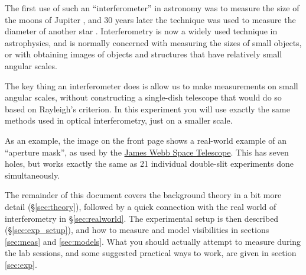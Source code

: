 \documentclass[11pt]{article}
\begin{document}
The first use of such an ``interferometer'' in astronomy was to measure the size of the moons of Jupiter \citep{1891PASP....3..274M,1891Natur..45..160M}, and 30 years later the technique was used to measure the diameter of another star \citep{1921ApJ....53..249M}. Interferometry is now a widely used technique in astrophysics, and is normally concerned with measuring the sizes of small objects, or with obtaining images of objects and structures that have relatively small angular scales.


The key thing an interferometer does is allow us to make measurements on small angular scales, without constructing a single-dish telescope that would do so based on Rayleigh's criterion. In this experiment you will use exactly the same methods used in optical interferometry, just on a smaller scale.

As an example, the image on the front page shows a real-world example of an ``aperture mask'', as used by the \href{https://jwst-docs.stsci.edu/jwst-near-infrared-imager-and-slitless-spectrograph/niriss-observing-modes/niriss-aperture-masking-interferometry}{James Webb Space Telescope}. This has seven holes, but works exactly the same as 21 individual double-slit experiments done simultaneously.

The remainder of this document covers the background theory in a bit more detail (\S \ref{sec:theory}), followed by a quick connection with the real world of interferometry in \S \ref{sec:realworld}. The experimental setup is then described (\S \ref{sec:exp_setup}), and how to measure and model visibilities in sections \ref{sec:meas} and \ref{sec:models}. What you should actually attempt to measure during the lab sessions, and some suggested practical ways to work, are given in section \ref{sec:exp}.
\end{document}
